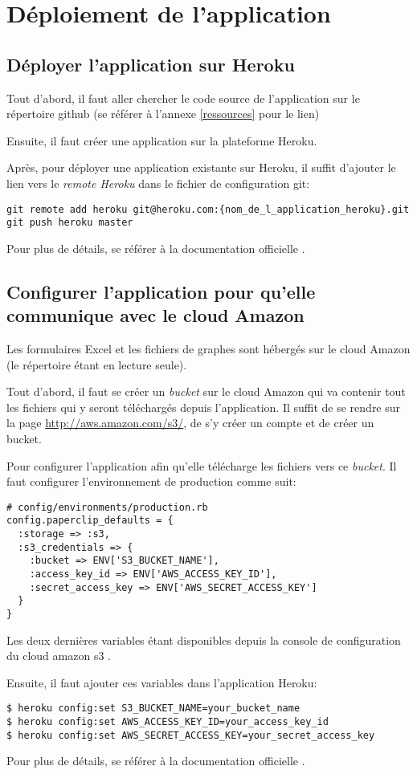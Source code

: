 \chapter{Déploiement de l'application}
\section{Déployer l'application sur Heroku}
Tout d'abord, il faut aller chercher le code source de l'application sur le répertoire github (se référer à l'annexe \ref{ressources} pour le lien)

Ensuite, il faut créer une application sur la plateforme Heroku. 

Après, pour déployer une application existante sur Heroku,  il suffit d'ajouter le lien vers le \textit{remote Heroku} dans le fichier de configuration git:

\begin{lstlisting}
git remote add heroku git@heroku.com:{nom_de_l_application_heroku}.git
git push heroku master
\end{lstlisting}

Pour plus de détails, se référer à la documentation officielle \cite{Heroku}.

\section{Configurer l'application pour qu'elle communique avec le cloud Amazon}
Les formulaires Excel et les fichiers de graphes sont hébergés sur le cloud Amazon (le répertoire étant en lecture seule). 

Tout d'abord, il faut se créer un \textit{bucket} sur le cloud Amazon qui va contenir tout les fichiers qui y seront téléchargés depuis l'application. Il suffit de se rendre sur la page \url{http://aws.amazon.com/s3/}, de s'y créer un compte et de créer un bucket.

Pour configurer l'application afin qu'elle télécharge les fichiers vers ce \textit{bucket}. Il faut configurer l’environnement de production comme suit:

\begin{lstlisting}
# config/environments/production.rb
config.paperclip_defaults = {
  :storage => :s3,
  :s3_credentials => {
    :bucket => ENV['S3_BUCKET_NAME'],
    :access_key_id => ENV['AWS_ACCESS_KEY_ID'],
    :secret_access_key => ENV['AWS_SECRET_ACCESS_KEY']
  }
}
\end{lstlisting}

Les deux dernières variables étant disponibles depuis la console de configuration du cloud amazon s3 \cite{AmazonS3}.

Ensuite, il faut ajouter ces variables dans l'application Heroku:

\begin{lstlisting}
$ heroku config:set S3_BUCKET_NAME=your_bucket_name
$ heroku config:set AWS_ACCESS_KEY_ID=your_access_key_id
$ heroku config:set AWS_SECRET_ACCESS_KEY=your_secret_access_key
\end{lstlisting}

Pour plus de détails, se référer à la documentation officielle \cite{AmazonS3}.